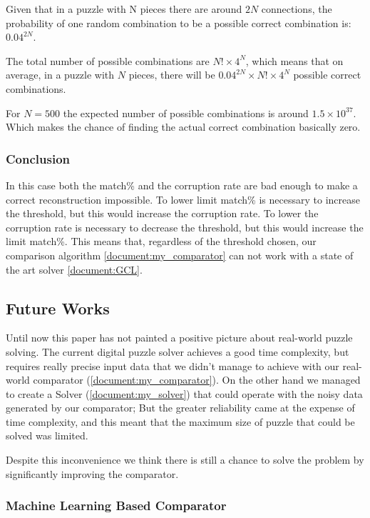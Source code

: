\documentclass[epsfig,a4paper,11pt,titlepage,twoside,openany]{article}
\begin{document}
Given that in a puzzle with N pieces there are around \(2N \) connections,
the probability of one random combination to be a
possible correct combination is: \(0.04^{2N}\).

The total number of possible combinations are \(N! \times 4^N\),
which means that on average, in a puzzle with \(N\) pieces,
there will be \(0.04^{2N} \times N! \times 4^N \)
possible correct combinations.

For \( N = 500 \) the expected number of possible combinations is around \( 1.5 \times 10^{37} \).
Which makes the chance of finding the actual correct combination basically zero.
\subsubsection{Conclusion}
In this case both the match\% and the corruption rate are bad enough to make a correct reconstruction impossible.
To lower limit match\% is necessary to increase the threshold, but this would increase the corruption rate.
To lower the corruption rate is necessary to decrease the threshold, but this would increase the limit match\%.
This means that, regardless of the threshold chosen, our comparison algorithm \cref{document:my_comparator}
can not work with a state of the art solver \cref{document:GCL}.


\subsection{Future Works}

Until now this paper has not painted a positive picture about real-world
puzzle solving. The current digital puzzle solver achieves a good time
complexity, but requires really precise input data that we didn't manage
to achieve with our real-world comparator (\cref{document:my_comparator}).
On the other hand we managed to create a Solver (\cref{document:my_solver})
that could operate with the noisy data generated by our comparator;
But the greater reliability came at the expense of time complexity,
and this meant that the maximum size of puzzle that could be solved was limited.

Despite this inconvenience we think there is still a chance to solve
the problem by significantly improving the comparator.

\subsubsection{Machine Learning Based Comparator}
\end{document}
